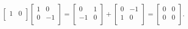 \documentclass[a4paper,12pt]{article}
\begin{document}
\begin{gather}
\begin{bmatrix}
            1 & 0\\
        \end{bmatrix}
        \begin{bmatrix}
            1 & 0\\
            0 & -1\\
        \end{bmatrix}
        =
        \begin{bmatrix}
            0 & 1\\
            -1 & 0\\
        \end{bmatrix}
        +
        \begin{bmatrix}
            0 & -1\\
            1 & 0\\
        \end{bmatrix}
        =
        \begin{bmatrix}
            0 & 0\\
            0 & 0\\
        \end{bmatrix}
        \textrm{.}
    \end{gather}
\end{document}
